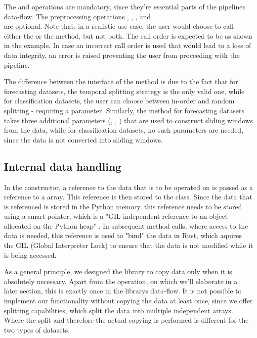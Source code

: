 \documentclass[review]{AIM_report}
\begin{document}
The \splitShort and \collect operations are mandatory, since they're essential parts of the pipelines data-flow. The preprocessing operations \impute, \downsample, \normalize, and \\\standardize are optional. Note that, in a realistic use case, the user would choose to call either the \normalize or the \standardize method, but not both. The call order is expected to be as shown in the example. In case an incorrect call order is used that would lead to a loss of data integrity, an error is raised preventing the user from proceeding with the pipeline.

The difference between the interface of the \splitShort method is due to the fact that for forecasting datasets, the temporal splitting strategy is the only valid one, while for classification datasets, the user can choose between in-order and random splitting - requiring a parameter. Similarly, the \collect method for forecasting datasets takes three additional parameters (\pastWindow, \futureHorizon, \stride) that are used to construct sliding windows from the data, while for classification datasets, no such parameters are needed, since the data is not converted into sliding windows.

\subsection{Internal data handling}

In the constructor, a reference to the data that is to be operated on is passed as a reference to a \numpy array. This reference is then stored to the class. Since the data that is referenced is stored in the Python memory, this reference needs to be stored using a \py smart pointer, which is a "GIL-independent reference to an object allocated on the Python heap" \cite{PyO3PyStruct}. In subsequent method calls, where access to the data is needed, this reference is used to "bind" the data in Rust, which aquires the GIL (Global Interpreter Lock) to ensure that the data is not modified while it is being accessed.

As a general principle, we designed the library to copy data only when it is absolutely necessary. Apart from the \downsample operation, on which we'll elaborate in a later section, this is exactly once in the librarys data-flow. It is not possible to implement our functionality without copying the data at least once, since we offer splitting capabilities, which split the data into multiple independent arrays. Where the split and therefore the actual copying is performed is different for the two types of datasets.
\end{document}

